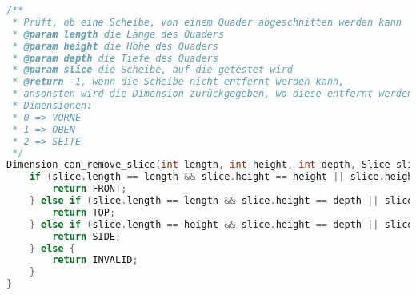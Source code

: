 \documentclass[a4paper,10pt,ngerman]{scrartcl}
\begin{document}
    \begin{lstlisting}[frame=single,language=C++,title=Methode can\_remove\_slice,breaklines=true,label={lst:code_canRemoveSlice}]
/**
 * Prüft, ob eine Scheibe, von einem Quader abgeschnitten werden kann
 * @param length die Länge des Quaders
 * @param height die Höhe des Quaders
 * @param depth die Tiefe des Quaders
 * @param slice die Scheibe, auf die getestet wird
 * @return -1, wenn die Scheibe nicht entfernt werden kann,
 * ansonsten wird die Dimension zurückgegeben, wo diese entfernt werden kann
 * Dimensionen:
 * 0 => VORNE
 * 1 => OBEN
 * 2 => SEITE
 */
Dimension can_remove_slice(int length, int height, int depth, Slice slice) {
    if (slice.length == length && slice.height == height || slice.height == length && slice.length == height) {
        return FRONT;
    } else if (slice.length == length && slice.height == depth || slice.height == length && slice.length == depth) {
        return TOP;
    } else if (slice.length == height && slice.height == depth || slice.height == height && slice.length == depth) {
        return SIDE;
    } else {
        return INVALID;
    }
}
    \end{lstlisting}

    \newpage
\end{document}
